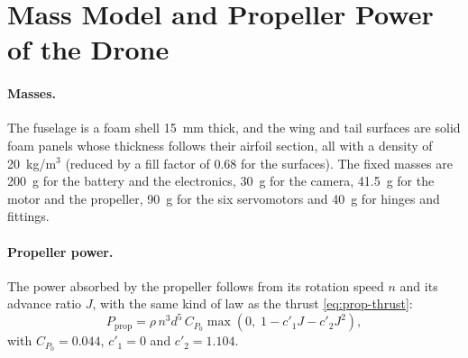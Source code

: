 \section{Mass Model and Propeller Power of the Drone}
\label{app:drone-mass-power}

\paragraph{Masses.} The fuselage is a foam shell 15~mm thick, and the wing and tail surfaces are solid foam panels whose thickness follows their airfoil section, all with a density of 20~kg/m$^3$ (reduced by a fill factor of 0.68 for the surfaces). The fixed masses are 200~g for the battery and the electronics, 30~g for the camera, 41.5~g for the motor and the propeller, 90~g for the six servomotors and 40~g for hinges and fittings.

\paragraph{Propeller power.} The power absorbed by the propeller follows from its rotation speed $n$ and its advance ratio $J$, with the same kind of law as the thrust \eqref{eq:prop-thrust}:
\begin{equation}
P_{\mathrm{prop}} = \rho\, n^3 d^5\, C_{P_0} \max\!\left(0,\; 1 - c'_1 J - c'_2 J^2\right),
\label{eq:drone-prop-power}
\end{equation}
with $C_{P_0} = 0.044$, $c'_1 = 0$ and $c'_2 = 1.104$.
